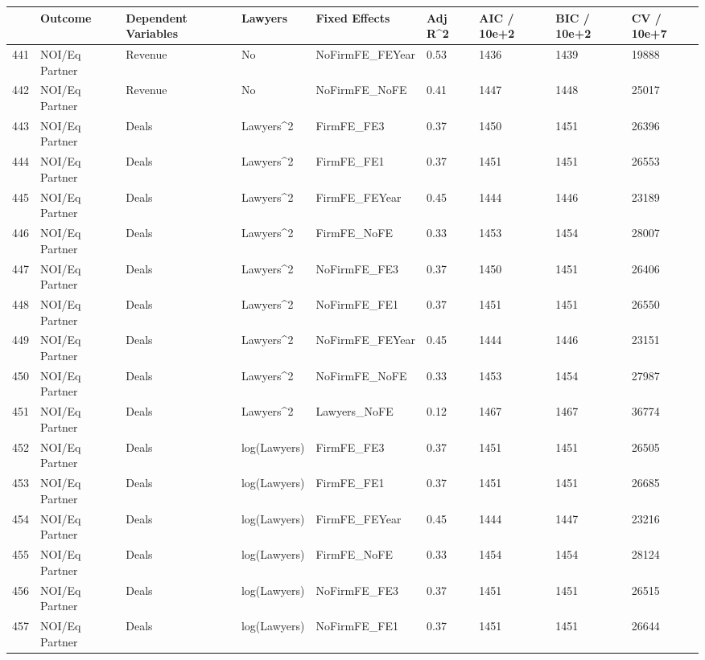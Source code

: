 \documentclass{article}
\begin{document}
\begin{table}[H]
\centering
\begin{tabular}{rllllllll}
  \hline
 & Outcome & Dependent Variables & Lawyers & Fixed Effects & Adj R^2 & AIC / 10e+2 & BIC / 10e+2 & CV / 10e+7 \\ 
  \hline
441 & NOI/Eq Partner & Revenue & No & NoFirmFE\_FEYear & 0.53 & 1436 & 1439 & 19888 \\ 
  442 & NOI/Eq Partner & Revenue & No & NoFirmFE\_NoFE & 0.41 & 1447 & 1448 & 25017 \\ 
  443 & NOI/Eq Partner & Deals & Lawyers^2 & FirmFE\_FE3 & 0.37 & 1450 & 1451 & 26396 \\ 
  444 & NOI/Eq Partner & Deals & Lawyers^2 & FirmFE\_FE1 & 0.37 & 1451 & 1451 & 26553 \\ 
  445 & NOI/Eq Partner & Deals & Lawyers^2 & FirmFE\_FEYear & 0.45 & 1444 & 1446 & 23189 \\ 
  446 & NOI/Eq Partner & Deals & Lawyers^2 & FirmFE\_NoFE & 0.33 & 1453 & 1454 & 28007 \\ 
  447 & NOI/Eq Partner & Deals & Lawyers^2 & NoFirmFE\_FE3 & 0.37 & 1450 & 1451 & 26406 \\ 
  448 & NOI/Eq Partner & Deals & Lawyers^2 & NoFirmFE\_FE1 & 0.37 & 1451 & 1451 & 26550 \\ 
  449 & NOI/Eq Partner & Deals & Lawyers^2 & NoFirmFE\_FEYear & 0.45 & 1444 & 1446 & 23151 \\ 
  450 & NOI/Eq Partner & Deals & Lawyers^2 & NoFirmFE\_NoFE & 0.33 & 1453 & 1454 & 27987 \\ 
  451 & NOI/Eq Partner & Deals & Lawyers^2 & Lawyers\_NoFE & 0.12 & 1467 & 1467 & 36774 \\ 
  452 & NOI/Eq Partner & Deals & log(Lawyers) & FirmFE\_FE3 & 0.37 & 1451 & 1451 & 26505 \\ 
  453 & NOI/Eq Partner & Deals & log(Lawyers) & FirmFE\_FE1 & 0.37 & 1451 & 1451 & 26685 \\ 
  454 & NOI/Eq Partner & Deals & log(Lawyers) & FirmFE\_FEYear & 0.45 & 1444 & 1447 & 23216 \\ 
  455 & NOI/Eq Partner & Deals & log(Lawyers) & FirmFE\_NoFE & 0.33 & 1454 & 1454 & 28124 \\ 
  456 & NOI/Eq Partner & Deals & log(Lawyers) & NoFirmFE\_FE3 & 0.37 & 1451 & 1451 & 26515 \\ 
  457 & NOI/Eq Partner & Deals & log(Lawyers) & NoFirmFE\_FE1 & 0.37 & 1451 & 1451 & 26644 \\ 

\end{tabular}
\end{table}
\end{document}
